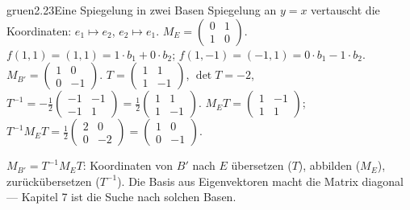 \begin{loesungkarte}{gruen}{2.23}{Eine Spiegelung in zwei Basen}
Spiegelung an $y = x$ vertauscht die Koordinaten: $e_1\mapsto e_2$, $e_2\mapsto e_1$. $M_E = \begin{pmatrix}0 & 1\\ 1 & 0\end{pmatrix}$.
$f(1, 1) = (1, 1) = 1\cdot b_1 + 0\cdot b_2$; $f(1, -1) = (-1, 1) = 0\cdot b_1 - 1\cdot b_2$. $M_{B'} = \begin{pmatrix}1 & 0\\ 0 & -1\end{pmatrix}$.
$T = \begin{pmatrix}1 & 1\\ 1 & -1\end{pmatrix}$, $\det T = -2$, $T^{-1} = -\frac12\begin{pmatrix}-1 & -1\\ -1 & 1\end{pmatrix} = \frac12\begin{pmatrix}1 & 1\\ 1 & -1\end{pmatrix}$. $M_ET = \begin{pmatrix}1 & -1\\ 1 & 1\end{pmatrix}$; $T^{-1}M_ET = \frac12\begin{pmatrix}2 & 0\\ 0 & -2\end{pmatrix} = \begin{pmatrix}1 & 0\\ 0 & -1\end{pmatrix}$. \checkmark
{}
\begin{mitnehmen}\kastentext
$M_{B'} = T^{-1}M_ET$: Koordinaten von $B'$ nach $E$ übersetzen ($T$), abbilden ($M_E$), zurückübersetzen ($T^{-1}$). Die Basis aus Eigenvektoren macht die Matrix diagonal --- Kapitel 7 ist die Suche nach solchen Basen.
\end{mitnehmen}
\end{loesungkarte}

